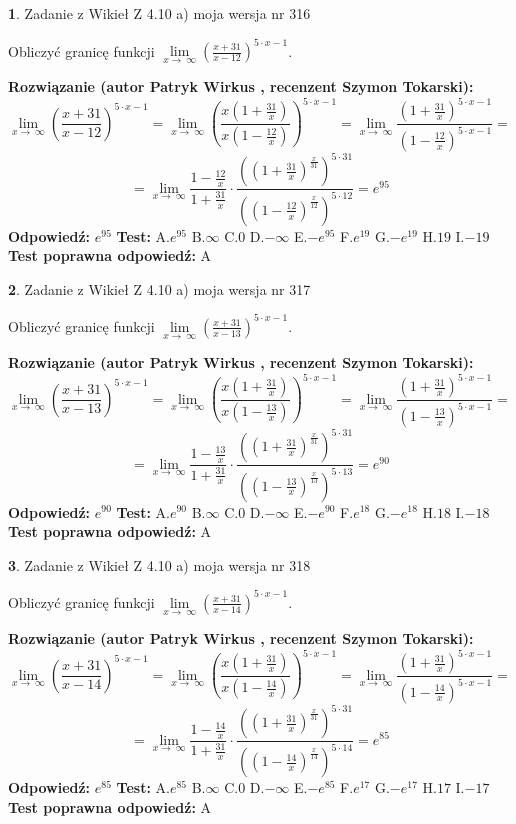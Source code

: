 \documentclass[12pt, a4paper]{article}
\theoremstyle{definition} %
\newtheorem{zad}{}
\newcommand{\zadStart}[1]{\begin{zad}#1\newline}
\newcommand{\zadStop}{\end{zad}}
\newcommand{\rozwStart}[2]{\noindent \textbf{Rozwiązanie (autor #1 , recenzent #2): }\newline}
\newcommand{\rozwStop}{\newline}
\newcommand{\odpStart}{\noindent \textbf{Odpowiedź:}\newline}
\newcommand{\odpStop}{\newline}
\newcommand{\testStart}{\noindent \textbf{Test:}\newline}
\newcommand{\testStop}{\newline}
\newcommand{\kluczStart}{\noindent \textbf{Test poprawna odpowiedź:}\newline}
\newcommand{\kluczStop}{\newline}
\begin{document}
\zadStart{Zadanie z Wikieł Z 4.10 a) moja wersja nr 316}

Obliczyć granicę funkcji  $\lim\limits_{x\to\ \infty}(\frac{x+31}{x-12})^{5\cdot x-1}$.
\zadStop
\rozwStart{Patryk Wirkus}{Szymon Tokarski}
$$\lim\limits_{x\to\ \infty}(\frac{x+31}{x-12})^{5\cdot x-1} = \lim\limits_{x\to\ \infty}(\frac{x(1+\frac{31}{x})}{x(1-\frac{12}{x})})^{5\cdot x-1}=\lim\limits_{x\to\ \infty}\frac{(1+\frac{31}{x})^{5\cdot x-1}}{(1-\frac{12}{x})^{5\cdot x-1}}=$$
$$=\lim\limits_{x\to\ \infty}\frac{1-\frac{12}{x}}{1+\frac{31}{x}}\cdot\frac{((1+\frac{31}{x})^{\frac{x}{31}})^{5\cdot31}}{((1-\frac{12}{x})^{\frac{x}{12}})^{5\cdot12}}=e^{95}$$
\rozwStop
\odpStart
$e^{95}$
\odpStop
\testStart
A.$e^{95}$ B.$\infty$ C.$0$ D.$-\infty$ E.$-e^{95}$
F.$e^{19}$ G.$-e^{19}$
H.$19$
I.$-19$
\testStop
\kluczStart
A
\kluczStop



\zadStart{Zadanie z Wikieł Z 4.10 a) moja wersja nr 317}

Obliczyć granicę funkcji  $\lim\limits_{x\to\ \infty}(\frac{x+31}{x-13})^{5\cdot x-1}$.
\zadStop
\rozwStart{Patryk Wirkus}{Szymon Tokarski}
$$\lim\limits_{x\to\ \infty}(\frac{x+31}{x-13})^{5\cdot x-1} = \lim\limits_{x\to\ \infty}(\frac{x(1+\frac{31}{x})}{x(1-\frac{13}{x})})^{5\cdot x-1}=\lim\limits_{x\to\ \infty}\frac{(1+\frac{31}{x})^{5\cdot x-1}}{(1-\frac{13}{x})^{5\cdot x-1}}=$$
$$=\lim\limits_{x\to\ \infty}\frac{1-\frac{13}{x}}{1+\frac{31}{x}}\cdot\frac{((1+\frac{31}{x})^{\frac{x}{31}})^{5\cdot31}}{((1-\frac{13}{x})^{\frac{x}{13}})^{5\cdot13}}=e^{90}$$
\rozwStop
\odpStart
$e^{90}$
\odpStop
\testStart
A.$e^{90}$ B.$\infty$ C.$0$ D.$-\infty$ E.$-e^{90}$
F.$e^{18}$ G.$-e^{18}$
H.$18$
I.$-18$
\testStop
\kluczStart
A
\kluczStop



\zadStart{Zadanie z Wikieł Z 4.10 a) moja wersja nr 318}

Obliczyć granicę funkcji  $\lim\limits_{x\to\ \infty}(\frac{x+31}{x-14})^{5\cdot x-1}$.
\zadStop
\rozwStart{Patryk Wirkus}{Szymon Tokarski}
$$\lim\limits_{x\to\ \infty}(\frac{x+31}{x-14})^{5\cdot x-1} = \lim\limits_{x\to\ \infty}(\frac{x(1+\frac{31}{x})}{x(1-\frac{14}{x})})^{5\cdot x-1}=\lim\limits_{x\to\ \infty}\frac{(1+\frac{31}{x})^{5\cdot x-1}}{(1-\frac{14}{x})^{5\cdot x-1}}=$$
$$=\lim\limits_{x\to\ \infty}\frac{1-\frac{14}{x}}{1+\frac{31}{x}}\cdot\frac{((1+\frac{31}{x})^{\frac{x}{31}})^{5\cdot31}}{((1-\frac{14}{x})^{\frac{x}{14}})^{5\cdot14}}=e^{85}$$
\rozwStop
\odpStart
$e^{85}$
\odpStop
\testStart
A.$e^{85}$ B.$\infty$ C.$0$ D.$-\infty$ E.$-e^{85}$
F.$e^{17}$ G.$-e^{17}$
H.$17$
I.$-17$
\testStop
\kluczStart
A
\kluczStop
\end{document}
